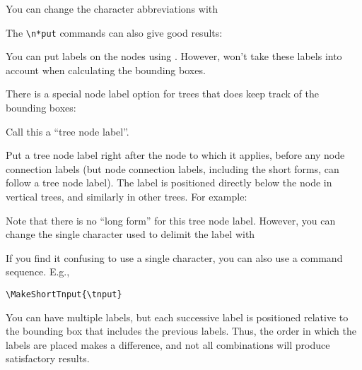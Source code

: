 \documentclass[11pt,english,BCOR10mm,DIV12,bibliography=totoc,parskip=false,smallheadings
    headexclude,footexclude,oneside]{pst-doc}
\begin{document}
You can change the character abbreviations with


\begin{BDef}
\end{BDef}

The \verb+\n*put+ commands can also give good results:

\begin{LTXexample}[pos=l,width=0.4\linewidth]
\end{LTXexample}

You can put labels on the nodes using . However,  won't take
these labels into account when calculating the bounding boxes.

There is a special node label option for trees that does keep track of the
bounding boxes:
\begin{BDef}
\Lnotation{\texttildelow}\OptArg*{*}\OptArgs{}
\end{BDef}
Call this a ``tree node label''.

Put a tree node label right after the node to which it applies, before any
node connection labels (but node connection labels, including the short forms,
can follow a tree node label). The label is positioned directly below the node
in vertical trees, and similarly in other trees. For example:


\begin{LTXexample}
\end{LTXexample}

Note that there is no ``long form'' for this tree node label. However, you can
change the single character used to delimit the label with
\begin{BDef}
\end{BDef}
If you find it confusing to use a single character, you can also use a command
sequence. E.g.,

\begin{lstlisting}[style=syntax]
\MakeShortTnput{\tnput}
\end{lstlisting}

You can have multiple labels, but each successive label is positioned relative
to the bounding box that includes the previous labels. Thus, the order in
which the labels are placed makes a difference, and not all combinations will
produce satisfactory results.
\end{document}
